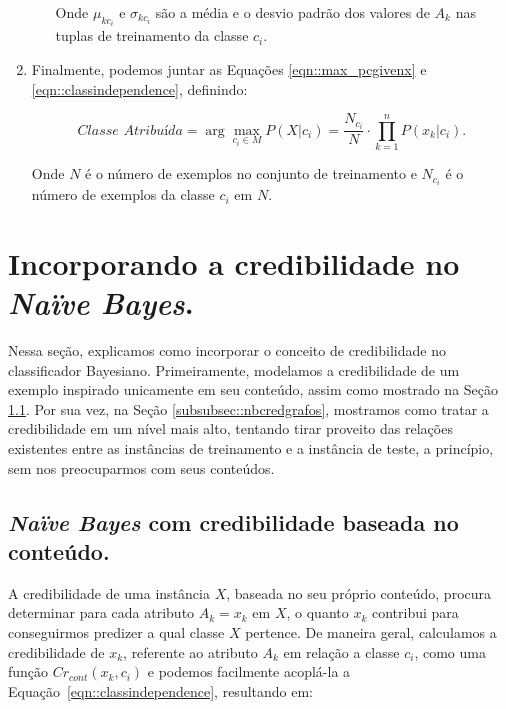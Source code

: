 \begin{enumerate}
\begin{itemize}
        Onde $\mu_{kc_i}$ e $\sigma_{kc_i}$ são a média e o desvio padrão dos valores de $A_k$ nas tuplas de treinamento da classe $c_i$. 

    \end{itemize}

    \item Finalmente, podemos juntar as Equações \ref{eqn::max_pcgivenx} e \ref{eqn::classindependence}, definindo:

    \begin{equation}\label{eqn::nbfinal}
    \textit{Classe Atribuída} = \arg\max_{c_i \in M}P(X|c_i) = \frac{N_{c_i}}{N} \cdot {\prod^{n}_{k=1}{P(x_k|c_i) }}.
    \end{equation}

    Onde $N$ é o número de exemplos no conjunto de treinamento e $N_{c_i}$ é o número de exemplos da classe $c_i$ em $N$.


\end{enumerate}


\section{Incorporando a credibilidade no \textit{Naïve Bayes}.}
\label{subsubsec::nb_cred}

Nessa seção, explicamos como incorporar o conceito de credibilidade no classificador Bayesiano. Primeiramente, modelamos a credibilidade de um exemplo inspirado unicamente em seu conteúdo, assim como mostrado na Seção \ref{subsubsec::nbcredconteudo}. Por sua vez, na Seção \ref{subsubsec::nbcredgrafos}, mostramos como tratar a credibilidade em um nível mais alto, tentando tirar proveito das relações existentes entre as instâncias de treinamento e a instância de teste, a princípio, sem nos preocuparmos com seus conteúdos.

\subsection{\textit{Naïve Bayes} com credibilidade baseada no conteúdo.}
\label{subsubsec::nbcredconteudo}

A credibilidade de uma instância $X$, baseada no seu próprio conteúdo, procura determinar para cada atributo $A_k = x_k$ em $X$, o quanto $x_k$ contribui para conseguirmos predizer a qual classe $X$ pertence. De maneira geral, calculamos a credibilidade de $x_k$, referente ao atributo $A_k$ em relação a classe $c_i$, como uma função $Cr_{cont}(x_k, c_i)$ e podemos facilmente acoplá-la a Equação~\ref{eqn::classindependence}, resultando em:

